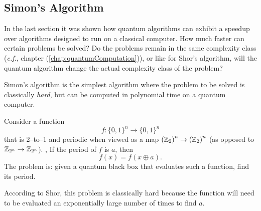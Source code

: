 \subsection{Simon's Algorithm}

In the last section it was shown how quantum algorithms can
exhibit a speedup over algorithms designed to run on a classical
computer.  How much faster can certain problems be solved?
Do the problems remain in the same complexity class ({\it c.f.},
chapter (\ref{chap:quantumComputation})), or like for Shor's 
algorithm, will the quantum algorithm change the actual 
complexity class of the problem?

Simon's algorithm\cite{Simon:97} 
is the simplest algorithm where the problem to
be solved is classically \emph{hard}, but can be computed in
polynomial time on a quantum computer.

Consider a function 
\begin{equation}
f\colon\lbrace 0,1\rbrace^n\to\lbrace 0,1\rbrace^n
\end{equation}
that is 2--to--1 and periodic when viewed as a map 
$\left({\mathbb{Z}}_2\right)^n\to\left({\mathbb{Z}}_2\right)^n$
(as opposed to ${\mathbb{Z}}_{2^n}\to{\mathbb{Z}}_{2^n}$).
\ie, If the period of $f$ is $a$, then
\begin{equation}
f(x) = f(x\oplus a).
\end{equation}
The problem is: given a quantum black box that evaluates such a function,
find its period.

According to Shor\cite{Shor:00}, this problem is classically hard
because the function will need to be evaluated an exponentially large number
of times to find $a$.

